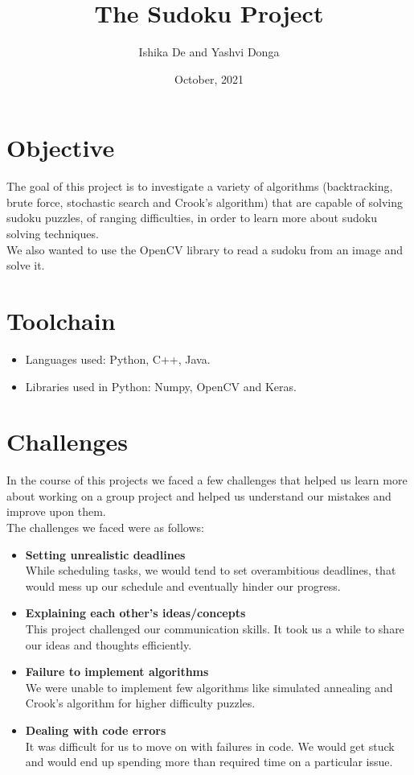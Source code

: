 \documentclass[12pt]{article}
\title {\textbf{The Sudoku Project}}
\author{Ishika De and Yashvi Donga}
\date{October, 2021}
\begin{document}
    \maketitle
    \section{Objective}
    The goal of this project is to investigate a variety of algorithms
    (backtracking, brute force, stochastic search and Crook’s algorithm) that
    are capable of solving sudoku puzzles, of ranging difficulties, in order to
    learn more about sudoku solving techniques.\\
    We also wanted to use the OpenCV library to read a sudoku from an
    image and solve it.
    \section{Toolchain}
    \begin{itemize}
        \item Languages used: Python, C++, Java.
        \item Libraries used in Python: Numpy, OpenCV and Keras.
    \end{itemize}
    \section{Challenges}
  In the course of this projects we faced a few challenges that helped us learn more about working on a group project and helped us understand our mistakes and improve upon them.\\
   The challenges we faced were as follows:
     \begin{itemize}
		 \item \textbf{Setting unrealistic deadlines}\\
		 While scheduling tasks, we would tend to set overambitious deadlines, that would mess up our schedule and eventually hinder our progress.
		 \item \textbf{Explaining each other's ideas/concepts}\\
		 This project challenged our communication skills. It took us a while to share our ideas and thoughts efficiently. \item \textbf{Failure to implement algorithms}\\
		 We were unable to implement few algorithms like simulated annealing and Crook's algorithm for higher difficulty puzzles. \item \textbf{Dealing with code errors}\\
		 It was difficult for us to move on with failures in code. We would get stuck and would end up spending more than required time on a particular issue.
	 \end{itemize}
\end{document}
